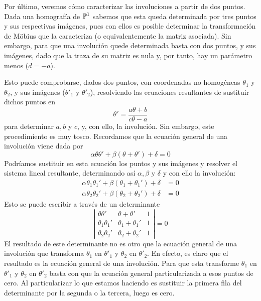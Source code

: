 Por último, veremos cómo caracterizar las involuciones a partir de dos puntos.\\

Dada una homografía de $\mathbb{P}^1$ sabemos que esta queda determinada por tres puntos y sus respectivas imágenes, pues con ellos es posible determinar la transformación de Möbius que la caracteriza (o equivalentemente la matriz asociada). Sin embargo, para que una involución quede determinada basta con dos puntos, y sus imágenes, dado que la traza de su matriz es nula y, por tanto, hay un parámetro menos ($d=-a$).

Esto puede comprobarse, dados dos puntos, con coordenadas no homogéneas $\theta_1$ y $\theta_2$, y sus imágenes ($\theta'_1$ y $\theta'_2$), resolviendo las ecuaciones resultantes de sustituir dichos puntos en 
\begin{equation}
	\label{C6:eq_moebius_haces_ec2}
	\theta'=\frac{a\theta+b}{c\theta -a}
\end{equation}
para determinar $a,b$ y $c$, y, con ello, la involución. Sin embargo, este procedimiento es muy tosco. Recordamos que la ecuación general de una involución viene dada por 
\begin{equation*}
	\alpha\theta\theta'+\beta(\theta+\theta')+\delta=0
\end{equation*}
Podríamos sustituir en esta ecuación los puntos y sus imágenes y resolver el sistema lineal resultante, determinando así $\alpha,\beta$ y $\delta$ y con ello la involución:
\begin{equation*}
	\begin{split}
		\alpha\theta_1\theta_1'+\beta(\theta_1+\theta_1')+\delta&=0\\
		\alpha\theta_2\theta_2'+\beta(\theta_2+\theta_2')+\delta&=0
	\end{split}
\end{equation*}
Esto se puede escribir a través de un determinante
\begin{equation}
	\left| \begin{array}{ccc}
		\theta\theta'&\theta+\theta'&1\\
		\theta_1\theta_1'&\theta_1+\theta_1'&1\\
		\theta_2\theta_2'&\theta_2+\theta_2'&1
	\end{array}\right| =0
\end{equation}
El resultado de este determinante no es otro que la ecuación general de una involución que transforma $\theta_1$ en $\theta'_1$ y $\theta_2$ en $\theta'_2$. En efecto, es claro que el resultado es la ecuación general de una involución. Para que esta transforme $\theta_1$ en $\theta'_1$ y $\theta_2$ en $\theta'_2$ basta con que la ecuación general particularizada a esos puntos de cero. Al particularizar lo que estamos haciendo es sustituir la primera fila del determinante por la segunda o la tercera, luego es cero.

